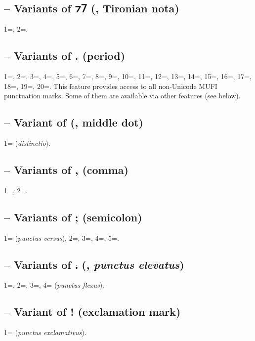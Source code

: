 \subsection{ -- Variants of ⁊⹒
(, Tironian nota)}
1=, 2=.

\subsection{ --
  Variants of . (period)}
1=, 2=, 3=, 4=, 5=, 6=,
7=, 8=, 9=, 10=, 11=, 12=,
13=, 14=, 15=, 16=, 17=,
18=, 19=, 20=. This
feature provides access to all non-Unicode MUFI punctuation marks. Some of them are available via other features (see
below).

\subsection{ -- Variant of {\textperiodcentered} (, middle dot)}
1= (\textit{distinctio}).

\subsection{ --
Variants of , (comma)}
1=, 2=.

\subsection{ --
Variants of ; (semicolon)}
1= (\textit{punctus versus}), 2=, 3=, 4=, 5=.

\subsection{ -- Variants of ⹎ (, \textit{punctus elevatus})}
1=, 2=, 3=, 4= (\textit{punctus flexus}).

\subsection{ -- Variant of ! (exclamation mark)}
1= (\textit{punctus exclamativus}).

